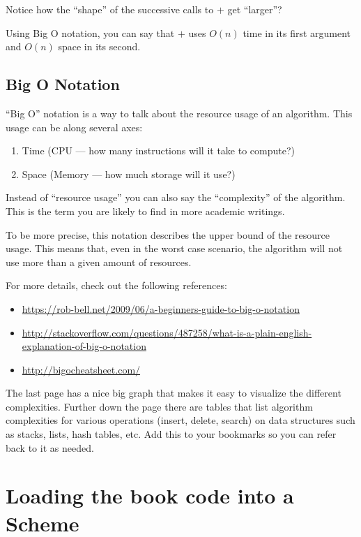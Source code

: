 \documentclass[12pt,openright,draft]{book}
\begin{document}
Notice how the ``shape'' of the successive calls to $+$ get
``larger''?

Using Big O notation, you can say that $+$ uses $O(n)$ time in its
first argument and $O(n)$ space in its second.

\section{Big O Notation}

``Big O'' notation is a way to talk about the resource usage of an
algorithm.  This usage can be along several axes:

\begin{enumerate}
\item Time (CPU --- how many instructions will it take to compute?)
\item Space (Memory --- how much storage will it use?)
\end{enumerate}

Instead of ``resource usage'' you can also say the ``complexity'' of
the algorithm.  This is the term you are likely to find in more
academic writings.

To be more precise, this notation describes the upper bound of the
resource usage.  This means that, even in the worst case scenario, the
algorithm will not use more than a given amount of resources.

For more details, check out the following references:

\begin{itemize}
\item \url{https://rob-bell.net/2009/06/a-beginners-guide-to-big-o-notation}

\item \url{http://stackoverflow.com/questions/487258/what-is-a-plain-english-explanation-of-big-o-notation}

\item \url{http://bigocheatsheet.com/}
\end{itemize}

The last page has a nice big graph that makes it easy to visualize the
different complexities.  Further down the page there are tables that
list algorithm complexities for various operations (insert, delete,
search) on data structures such as stacks, lists, hash tables, etc.
Add this to your bookmarks so you can refer back to it as needed.

\appendix
\chapter{Loading the book code into a Scheme}
\end{document}
